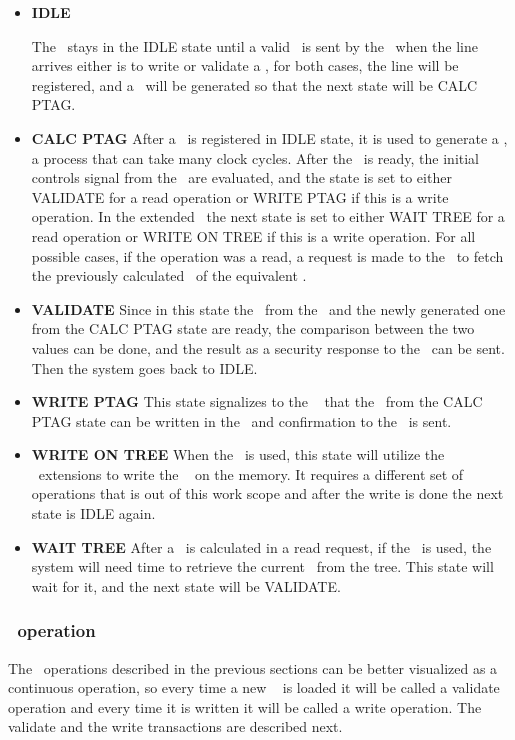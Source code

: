 \begin{itemize}
  \item{\textbf{IDLE}}
 
The \seceng~stays in the IDLE  state until a valid \sline~is sent by the \handler~when the line arrives either is to write or validate a \ptag, for both cases, the line will be registered, and a \ptag~will be generated so that the next state will be CALC PTAG. 
 
  \item{\textbf{CALC PTAG}}
  After a \sline~is registered in IDLE state, it is used to generate a \ptag, a process that can take many clock cycles. After the \ptag~is ready, the initial controls signal from the \handler~are evaluated, and the state is set to either VALIDATE for a read operation or  WRITE PTAG if this is a write operation.  In the extended \cshia~the next state is set to either WAIT TREE for a read operation or  WRITE ON TREE if this is a write operation. For all possible cases, if the operation was a read, a request is made to the \pmmu~to fetch the previously calculated \ptag~of the equivalent \sline.
  

  \item{\textbf{VALIDATE}}
  Since in this state the \ptag~from the \ptagmem~and the newly generated one from the CALC PTAG state are ready, the comparison between the two values can be done, and the result as a security response to the \handler~can be sent. Then the system goes back to IDLE.
  

 \item{\textbf{WRITE PTAG}}
  This state signalizes to the \pmmu~ that the \ptag~from the CALC PTAG state can be written in the \ptagmem~and confirmation to the \handler~is sent.
  
   \item{\textbf{WRITE ON TREE}}
  When the \mt~is used, this state will utilize the \cshia~extensions to write the \ptag~ on the memory. It requires a different set of operations that is out of this work scope and after the write is done the next state is IDLE again.
  
  \item{\textbf{WAIT TREE}}
  After a \ptag~is calculated in a read request, if the \mt~is used,  the system will need time to retrieve the current \ptag~from the tree. This state will wait for it, and the next state will be VALIDATE.

\end{itemize}

\subsubsection{\seceng~operation }
The \seceng~operations described in the previous sections can be better visualized as a continuous operation, so every time a new \sline~ is loaded it will be called a validate operation and every time it is written it will be called a write operation. The validate and the write transactions are described next.



